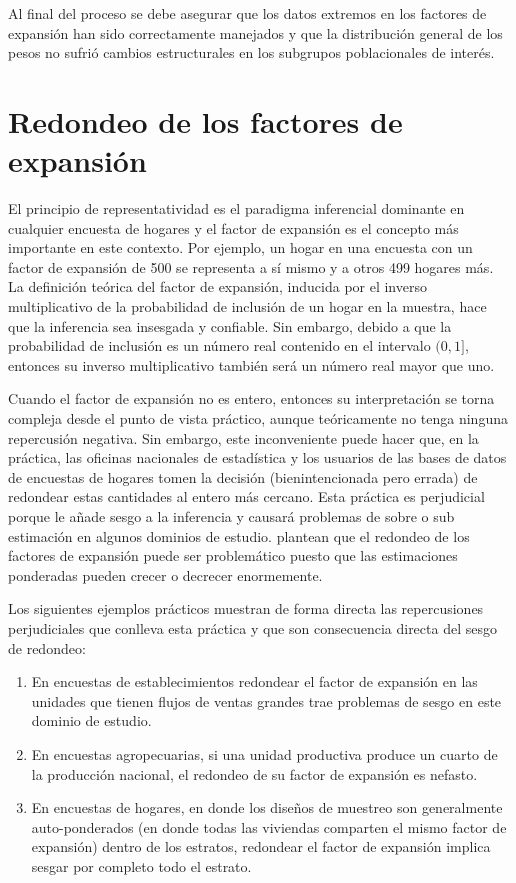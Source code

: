 \documentclass[
  10pt,
  spanish,
]{book}
\providecommand{\tightlist}{%
  \setlength{\itemsep}{0pt}\setlength{\parskip}{0pt}}
\begin{document}
Al final del proceso se debe asegurar que los datos extremos en los factores de expansión han sido correctamente manejados y que la distribución general de los pesos no sufrió cambios estructurales en los subgrupos poblacionales de interés.

\hypertarget{redondeo-de-los-factores-de-expansiuxf3n}{%
\section{Redondeo de los factores de expansión}\label{redondeo-de-los-factores-de-expansiuxf3n}}

El principio de representatividad es el paradigma inferencial dominante en cualquier encuesta de hogares y el factor de expansión es el concepto más importante en este contexto. Por ejemplo, un hogar en una encuesta con un factor de expansión de 500 se representa a sí mismo y a otros 499 hogares más. La definición teórica del factor de expansión, inducida por el inverso multiplicativo de la probabilidad de inclusión de un hogar en la muestra, hace que la inferencia sea insesgada y confiable. Sin embargo, debido a que la probabilidad de inclusión es un número real contenido en el intervalo \((0, 1]\), entonces su inverso multiplicativo también será un número real mayor que uno.

Cuando el factor de expansión no es entero, entonces su interpretación se torna compleja desde el punto de vista práctico, aunque teóricamente no tenga ninguna repercusión negativa. Sin embargo, este inconveniente puede hacer que, en la práctica, las oficinas nacionales de estadística y los usuarios de las bases de datos de encuestas de hogares tomen la decisión (bienintencionada pero errada) de redondear estas cantidades al entero más cercano. Esta práctica es perjudicial porque le añade sesgo a la inferencia y causará problemas de sobre o sub estimación en algunos dominios de estudio. \citet{Sartore_Toppin_Young_Spiegelman_2019} plantean que el redondeo de los factores de expansión puede ser problemático puesto que las estimaciones ponderadas pueden crecer o decrecer enormemente.

Los siguientes ejemplos prácticos muestran de forma directa las repercusiones perjudiciales que conlleva esta práctica y que son consecuencia directa del sesgo de redondeo:

\begin{enumerate}
\def\labelenumi{\arabic{enumi}.}
\tightlist
\item
  En encuestas de establecimientos redondear el factor de expansión en las unidades que tienen flujos de ventas grandes trae problemas de sesgo en este dominio de estudio.
\item
  En encuestas agropecuarias, si una unidad productiva produce un cuarto de la producción nacional, el redondeo de su factor de expansión es nefasto.
\item
  En encuestas de hogares, en donde los diseños de muestreo son generalmente auto-ponderados (en donde todas las viviendas comparten el mismo factor de expansión) dentro de los estratos, redondear el factor de expansión implica sesgar por completo todo el estrato.
\end{enumerate}
\end{document}
